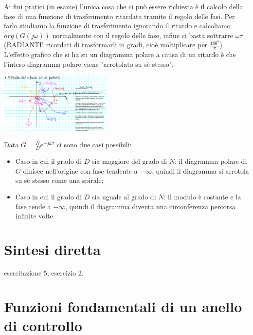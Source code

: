         \newline
        Ai fini pratici (in esame) l'unica cosa che ci può essere richiesta è il calcolo della fase di una funzione di trasferimento ritardata tramite il regolo delle fasi. Per farlo studiamo la funzione di trasferimento ignorando il ritardo e calcoliamo $arg(G(j \omega))$ normalmente con il regolo delle fase, infine ci basta sottrarre $\omega \tau$ (RADIANTI! ricordati di trasformarli in gradi, cioè moltiplicare per $\frac{180^o}{\pi}$). \newline
        \newline
        L'effetto grafico che si ha su un diagramma polare a causa di un ritardo è che l'intero diagramma polare viene "arrotolato su sè stesso".
        \begin{center}
            \includegraphics[height=3cm]{../lezione17/img2.PNG}
        \end{center}
        Data $G = \frac{N}{D} e^{- j \omega \tau}$ ci sono due casi possibili:
        \begin{itemize}
            \item Caso in cui il grado di $D$ sia maggiore del grado di $N$: il diagramma polare di $G$ dinisce nell'origine con fase tendente a $- \infty$, quindi il diagramma si arrotola su sè stesso come una spirale;
            \item Caso in cui il grado di $D$ sia uguale al grado di $N$: il modulo è costante e la fase tende a $- \infty$, quindi il diagramma diventa una circonferenza percorsa infinite volte.
        \end{itemize}
    \newpage\section{Sintesi diretta}
    esercitazione 5, esercizio 2.
    \newpage\section{Funzioni fondamentali di un anello di controllo}

